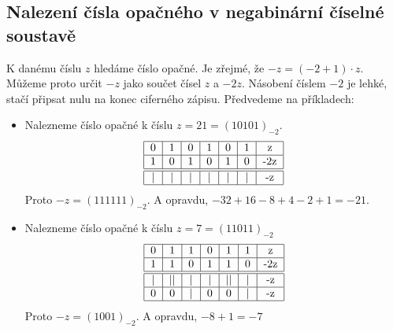 \documentclass[czech,bachelor,dept470,male]{diploma}
\begin{document}
\subsection{Nalezení čísla opačného v negabinární číselné soustavě}
K danému číslu $z$ hledáme číslo opačné. Je zřejmé, že $-z = (-2 + 1)\cdot z$. Můžeme proto určit $-z$ jako součet čísel $z$ a $-2z$. Násobení číslem $-2$ je lehké, stačí připsat nulu na konec ciferného zápisu. Předvedeme na příkladech:
\begin{itemize}
	\item Nalezneme číslo opačné k číslu $z = 21 = (10101)_{-2}$.
	      \begin{equation}\label{NBprsoucT6}
		      \begin{tabular}{|c|c|c|c|c|c|c|}
			      \hline
			      0 & 1 & 0 & 1 & 0 & 1 & z   \\ \hline
			      1 & 0 & 1 & 0 & 1 & 0 & -2z \\ \hline \hline
			      | & | & | & | & | & | & -z  \\
			      \hline
		      \end{tabular}
	      \end{equation}
	      Proto $-z = (111111)_{-2}$. A opravdu, $-32 + 16 - 8 + 4 - 2 + 1 = -21$.
	\item Nalezneme číslo opačné k číslu $z = 7 = (11011)_{-2}$
	      \begin{equation}\label{NBprsoucT6B}
		      \begin{tabular}{|c|c|c|c|c|c|c|}
			      \hline
			      0 & 1  & 1 & 0 & 1  & 1 & z   \\ \hline
			      1 & 1  & 0 & 1 & 1  & 0 & -2z \\ \hline \hline
			      | & || & | & | & || & | & -z  \\ \hline
			      0 & 0  & | & 0 & 0  & | & -z  \\ \hline
		      \end{tabular}
	      \end{equation}
	      Proto $-z = (1001)_{-2}$. A opravdu, $- 8 + 1 = -7$
\end{itemize}
\end{document}
